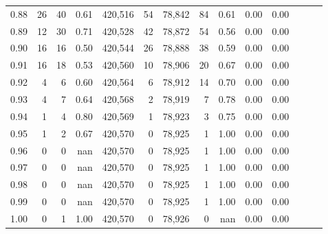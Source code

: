 \begin{tabular}{rrrrrrrrrrrrrr}
0.88 &      26 &     40 &  0.61 &  420,516 &       54 &  78,842 &      84 &  0.61 &  0.00 &      0.00 \\
0.89 &      12 &     30 &  0.71 &  420,528 &       42 &  78,872 &      54 &  0.56 &  0.00 &      0.00 \\
0.90 &      16 &     16 &  0.50 &  420,544 &       26 &  78,888 &      38 &  0.59 &  0.00 &      0.00 \\
0.91 &      16 &     18 &  0.53 &  420,560 &       10 &  78,906 &      20 &  0.67 &  0.00 &      0.00 \\
0.92 &       4 &      6 &  0.60 &  420,564 &        6 &  78,912 &      14 &  0.70 &  0.00 &      0.00 \\
0.93 &       4 &      7 &  0.64 &  420,568 &        2 &  78,919 &       7 &  0.78 &  0.00 &      0.00 \\
0.94 &       1 &      4 &  0.80 &  420,569 &        1 &  78,923 &       3 &  0.75 &  0.00 &      0.00 \\
0.95 &       1 &      2 &  0.67 &  420,570 &        0 &  78,925 &       1 &  1.00 &  0.00 &      0.00 \\
0.96 &       0 &      0 &   nan &  420,570 &        0 &  78,925 &       1 &  1.00 &  0.00 &      0.00 \\
0.97 &       0 &      0 &   nan &  420,570 &        0 &  78,925 &       1 &  1.00 &  0.00 &      0.00 \\
0.98 &       0 &      0 &   nan &  420,570 &        0 &  78,925 &       1 &  1.00 &  0.00 &      0.00 \\
0.99 &       0 &      0 &   nan &  420,570 &        0 &  78,925 &       1 &  1.00 &  0.00 &      0.00 \\
1.00 &       0 &      1 &  1.00 &  420,570 &        0 &  78,926 &       0 &   nan &  0.00 &      0.00 \\
\bottomrule
\end{tabular}
